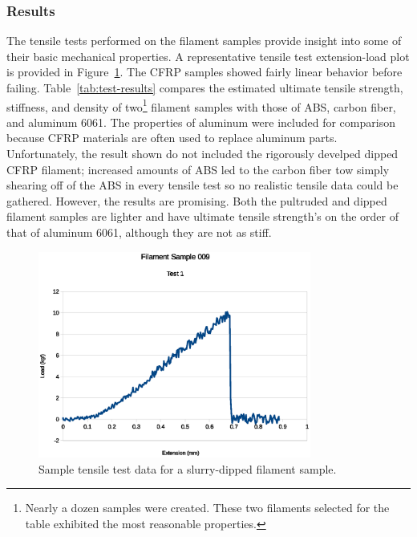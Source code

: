 \clearpage

\subsubsection{Results}

\indent

The tensile tests performed on the filament samples provide insight into some of their basic mechanical properties. A representative tensile test extension-load plot is provided in Figure~\ref{fig:instron-sample}. The CFRP samples showed fairly linear behavior before failing. Table~\ref{tab:test-results} compares the estimated ultimate tensile strength, stiffness, and density of two\footnote{Nearly a dozen samples were created. These two filaments selected for the table exhibited the most reasonable properties.} filament samples with those of ABS, carbon fiber, and aluminum 6061. The properties of aluminum were included for comparison because CFRP materials are often used to replace aluminum parts. Unfortunately, the result shown do not included the rigorously develped dipped CFRP filament; increased amounts of ABS led to the carbon fiber tow simply shearing off of the ABS in every tensile test so no realistic tensile data could be gathered. However, the results are promising. Both the pultruded and dipped filament samples are lighter and have ultimate tensile strength's on the order of that of aluminum 6061, although they are not as stiff.\\

\begin{figure}[htp]
    \centering
    \includegraphics[width=0.8\textwidth]{./figures/009T1-instron-data}
    \caption{Sample tensile test data for a slurry-dipped filament sample.}
    \label{fig:instron-sample}
\end{figure}

